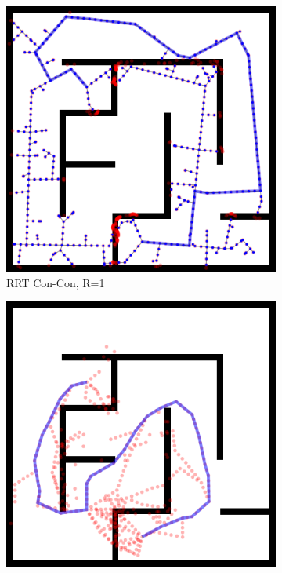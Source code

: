 \begin{figure}
\begin{subfigure}[b]{0.3\textwidth}
      \includegraphics[width=\textwidth]{figs/compare-2d-rrtc1-rrtconcon-r1-s1.png}
      \caption{RRT Con-Con, R=1}
   \end{subfigure}%
   \quad
   \begin{subfigure}[b]{0.3\textwidth}
      \includegraphics[width=\textwidth]{figs/compare-2d-rrtc1-checkmask-l00-s1.png}

\end{subfigure}
\end{figure}
